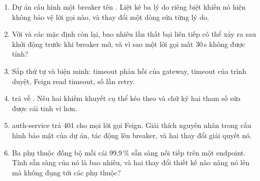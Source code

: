 \begin{quiz}
\begin{enumerate}
  \item Dự án cấu hình một breaker tên . Liệt kê ba
  lý do riêng biệt khiến nó hiện không bảo vệ lời gọi nào, và thay đổi
  một dòng sửa từng lý do.
  \item Với  và các mặc định còn lại, bao
  nhiêu lần thất bại liên tiếp có thể xảy ra sau khởi động trước khi
  breaker mở, và vì sao một lời gọi mất 30\,s không được tính?
  \item Sắp thứ tự và biện minh: timeout phản hồi của gateway, timeout
  của trình duyệt, Feign read timeout, số lần retry.
  \item {} trả về . Nêu
  hai khiếm khuyết cụ thể kéo theo và chữ ký hai tham số sửa được cái
  tinh vi hơn.
  \item auth-service trả 401 cho mọi lời gọi Feign. Giải thích nguyên
  nhân trong cấu hình bảo mật của dự án, tác động lên breaker, và hai
  thay đổi giải quyết nó.
  \item Ba phụ thuộc đồng bộ mỗi cái 99,9\,\% sẵn sàng nối tiếp trên
  một endpoint. Tính sẵn sàng của nó là bao nhiêu, và hai thay đổi thiết
  kế nào nâng nó lên mà không đụng tới các phụ thuộc?
\end{enumerate}
\end{quiz}
